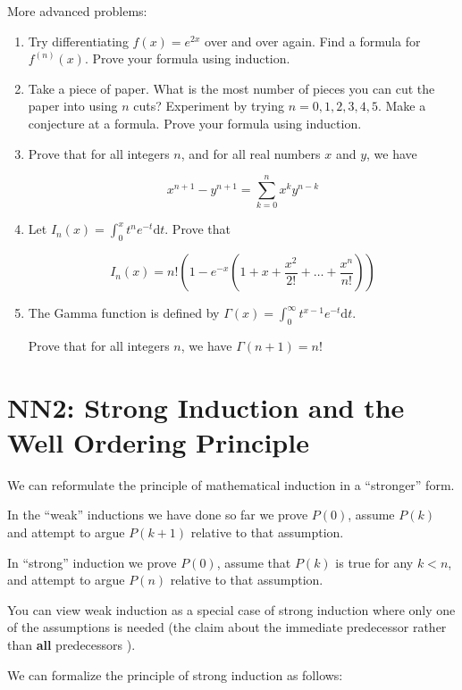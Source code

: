 \begin{xca}
More advanced problems:

\begin{enumerate}
	\item Try differentiating $f(x) = e^{2x}$ over and over again.  Find a formula for $f^{(n)}(x)$.  Prove your formula using induction.
	\item Take a piece of paper.  What is the most number of pieces you can cut the paper into using $n$ cuts?  Experiment by trying $n=0, 1,2,3,4,5$.  Make a conjecture at a formula.  Prove your formula using induction.
	\item Prove that for all integers $n$, and for all real numbers $x$ and $y$, we have
	
	\[
	x^{n+1} - y^{n+1} = \sum_{k=0}^{n} x^k y^{n-k}
	\]
	\item Let $I_n(x) = \displaystyle \int_0^x t^n e^{-t} \textrm{d}t$.  Prove that
	
	\[
	I_n(x) = n! \left(1-e^{-x}(1+x+\frac{x^2}{2!}+ \dots + \frac{x^n}{n!})\right)
	\]
	
	\item The Gamma function is defined by $ \Gamma(x) = \displaystyle \int_0^\infty t^{x-1}e^{-t} \textrm{d}t $.
	
	Prove that for all integers $n$, we have $\Gamma(n+1) = n!$
	
\end{enumerate}
\end{xca}

\section{NN2: Strong Induction and the Well Ordering Principle}

We can reformulate the principle of mathematical induction in a ``stronger'' form.  

In the ``weak'' inductions we have done so far we prove $P(0)$, assume $P(k)$ and attempt to argue $P(k+1)$ relative to that assumption.

In ``strong'' induction we prove $P(0)$, assume that $P(k)$ is true for any $k<n$, and attempt to argue $P(n)$ relative to that assumption.  

You can view weak induction as a special case of strong induction where only one of the assumptions is needed (the claim about the immediate predecessor rather than \textbf{all} predecessors ).

We can formalize the principle of strong induction as follows:

